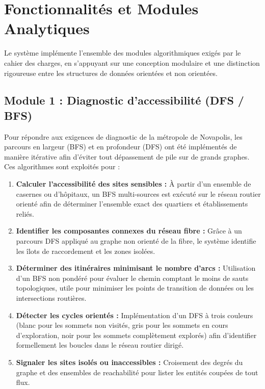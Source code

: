 \section{Fonctionnalités et Modules Analytiques}

Le système implémente l'ensemble des modules algorithmiques exigés par le cahier des charges, en s'appuyant sur une conception modulaire et une distinction rigoureuse entre les structures de données orientées et non orientées.

\subsection{Module 1 : Diagnostic d'accessibilité (DFS / BFS)}
Pour répondre aux exigences de diagnostic de la métropole de Novapolis, les parcours en largeur (BFS) et en profondeur (DFS) ont été implémentés de manière itérative afin d'éviter tout dépassement de pile sur de grands graphes. Ces algorithmes sont exploités pour :
\begin{enumerate}
    \item \textbf{Calculer l'accessibilité des sites sensibles :} À partir d'un ensemble de casernes ou d'hôpitaux, un BFS multi-sources est exécuté sur le réseau routier orienté afin de déterminer l'ensemble exact des quartiers et établissements reliés.
    \item \textbf{Identifier les composantes connexes du réseau fibre :} Grâce à un parcours DFS appliqué au graphe non orienté de la fibre, le système identifie les îlots de raccordement et les zones isolées.
    \item \textbf{Déterminer des itinéraires minimisant le nombre d'arcs :} Utilisation d'un BFS non pondéré pour évaluer le chemin comptant le moins de sauts topologiques, utile pour minimiser les points de transition de données ou les intersections routières.
    \item \textbf{Détecter les cycles orientés :} Implémentation d'un DFS à trois couleurs (blanc pour les sommets non visités, gris pour les sommets en cours d'exploration, noir pour les sommets complètement explorés) afin d'identifier formellement les boucles dans le réseau routier dirigé.
    \item \textbf{Signaler les sites isolés ou inaccessibles :} Croisement des degrés du graphe et des ensembles de reachabilité pour lister les entités coupées de tout flux.
\end{enumerate}


